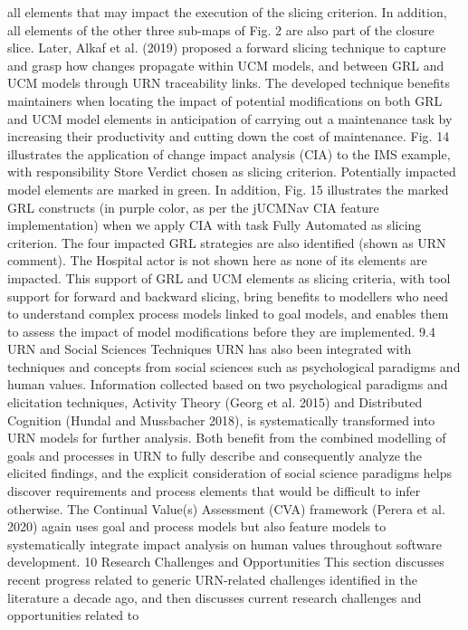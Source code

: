 all elements that may impact the execution of the
slicing criterion. In addition, all elements of the
other three sub-maps of Fig. 2 are also part of the
closure slice.
Later, Alkaf et al. (2019) proposed a forward
slicing technique to capture and grasp how changes
propagate within UCM models, and between GRL
and UCM models through URN traceability links.
The developed technique benefits maintainers
when locating the impact of potential modifications on both GRL and UCM model elements in
anticipation of carrying out a maintenance task
by increasing their productivity and cutting down
the cost of maintenance. Fig. 14 illustrates the
application of change impact analysis (CIA) to
the IMS example, with responsibility Store Verdict
chosen as slicing criterion. Potentially impacted
model elements are marked in green.
In addition, Fig. 15 illustrates the marked GRL
constructs (in purple color, as per the jUCMNav
CIA feature implementation) when we apply CIA
with task Fully Automated as slicing criterion. The
four impacted GRL strategies are also identified
(shown as URN comment). The Hospital actor is
not shown here as none of its elements are impacted. This support of GRL and UCM elements
as slicing criteria, with tool support for forward
and backward slicing, bring benefits to modellers
who need to understand complex process models
linked to goal models, and enables them to assess
the impact of model modifications before they are
implemented.
9.4 URN and Social Sciences Techniques
URN has also been integrated with techniques and
concepts from social sciences such as psychological paradigms and human values. Information
collected based on two psychological paradigms
and elicitation techniques, Activity Theory (Georg
et al. 2015) and Distributed Cognition (Hundal
and Mussbacher 2018), is systematically transformed into URN models for further analysis.
Both benefit from the combined modelling of
goals and processes in URN to fully describe and
consequently analyze the elicited findings, and the
explicit consideration of social science paradigms
helps discover requirements and process elements
that would be difficult to infer otherwise. The
Continual Value(s) Assessment (CVA) framework
(Perera et al. 2020) again uses goal and process
models but also feature models to systematically
integrate impact analysis on human values throughout software development.
10 Research Challenges and
Opportunities
This section discusses recent progress related to
generic URN-related challenges identified in the
literature a decade ago, and then discusses current
research challenges and opportunities related to
